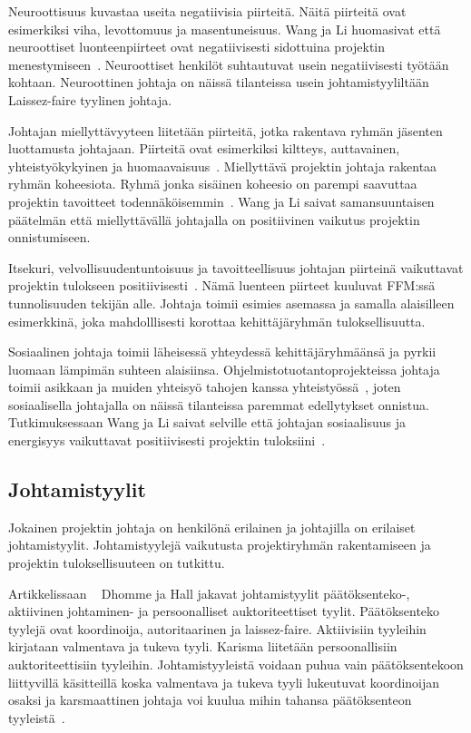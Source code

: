 \documentclass[finnish]{tktltiki2}
\theoremstyle{definition}
\theoremstyle{remark}
\begin{document}
Neuroottisuus kuvastaa useita negatiivisia piirteitä. Näitä piirteitä ovat esimerkiksi viha, levottomuus ja masentuneisuus. Wang ja Li huomasivat että neuroottiset luonteenpiirteet ovat negatiivisesti sidottuina projektin menestymiseen~\cite{Wang:2009:PMP:1639950.1640049}. Neuroottiset henkilöt suhtautuvat usein negatiivisesti työtään kohtaan. Neuroottinen johtaja on näissä tilanteissa usein johtamistyyliltään Laissez-faire tyylinen johtaja.

Johtajan miellyttävyyteen liitetään piirteitä, jotka rakentava ryhmän jäsenten luottamusta johtajaan. Piirteitä ovat esimerkiksi kiltteys, auttavainen, yhteistyökykyinen ja huomaavaisuus~\cite{Wang:2009:PMP:1639950.1640049}. Miellyttävä projektin johtaja rakentaa ryhmän koheesiota. Ryhmä jonka sisäinen koheesio on parempi saavuttaa projektin tavoitteet todennäköisemmin~\cite{bahli2005group}. Wang ja Li saivat samansuuntaisen päätelmän että miellyttävällä johtajalla on positiivinen vaikutus projektin onnistumiseen.

Itsekuri, velvollisuudentuntoisuus ja tavoitteellisuus johtajan piirteinä vaikuttavat projektin tulokseen positiivisesti~\cite{Wang:2009:PMP:1639950.1640049}. Nämä luenteen piirteet kuuluvat FFM:ssä tunnolisuuden tekijän alle. Johtaja toimii esimies asemassa ja samalla alaisilleen esimerkkinä, joka mahdolllisesti korottaa kehittäjäryhmän tuloksellisuutta. 

Sosiaalinen johtaja toimii läheisessä yhteydessä kehittäjäryhmäänsä ja pyrkii luomaan lämpimän suhteen alaisiinsa. Ohjelmistotuotantoprojekteissa johtaja toimii asikkaan ja muiden yhteisyö tahojen kanssa yhteistyössä~\cite{McLeod:2011:FAS:1978802.1978803}, joten sosiaalisella johtajalla on näissä tilanteissa paremmat edellytykset onnistua. Tutkimuksessaan Wang ja Li saivat selville että johtajan sosiaalisuus ja energisyys vaikuttavat positiivisesti  projektin tuloksiini~\cite{Wang:2009:PMP:1639950.1640049}. 

\subsection{Johtamistyylit}

Jokainen projektin johtaja on henkilönä erilainen ja johtajilla on erilaiset johtamistyylit. Johtamistyylejä vaikutusta projektiryhmän rakentamiseen ja projektin tuloksellisuuteen on tutkittu. 

Artikkelissaan ~\cite{Dhomne:2012:ITL:2382887.2382899} Dhomme ja Hall jakavat johtamistyylit päätöksenteko-, aktiivinen johtaminen- ja persoonalliset auktoriteettiset tyylit. Päätöksenteko tyylejä ovat koordinoija, autoritaarinen ja laissez-faire. Aktiivisiin tyyleihin kirjataan valmentava ja tukeva tyyli. Karisma liitetään persoonallisiin auktoriteettisiin tyyleihin. Johtamistyyleistä voidaan puhua vain päätöksentekoon liittyvillä käsitteillä koska valmentava ja tukeva tyyli lukeutuvat koordinoijan osaksi ja karsmaattinen johtaja voi kuulua mihin tahansa päätöksenteon tyyleistä~\cite{Dhomne:2012:ITL:2382887.2382899}. 
\end{document}
